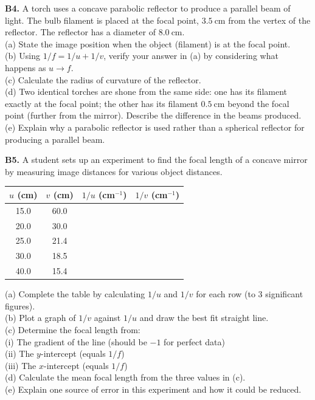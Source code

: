 \begin{exercisebox}[19]
\vspace{0.4cm}

\textbf{B4.} A torch uses a concave parabolic
reflector to produce a parallel beam of light.
The bulb filament is placed at the focal point,
$3.5\ \text{cm}$ from the vertex of the reflector.
The reflector has a diameter of $8.0\ \text{cm}$.\\[4pt]
(a) State the image position when the object
(filament) is at the focal point.\\
(b) Using $1/f = 1/u + 1/v$, verify your answer
in (a) by considering what happens as $u \to f$.\\
(c) Calculate the radius of curvature of the
reflector.\\
(d) Two identical torches are shone from the same
side: one has its filament exactly at the focal
point; the other has its filament $0.5\ \text{cm}$
beyond the focal point (further from the mirror).
Describe the difference in the beams produced.\\
(e) Explain why a parabolic reflector is used
rather than a spherical reflector for producing
a parallel beam.
\hfill{}

\vspace{0.4cm}

\textbf{B5.} A student sets up an experiment to
find the focal length of a concave mirror by
measuring image distances for various object
distances.

\begin{center}
\begin{tabular}{cccc}
\toprule
$u$ (cm) & $v$ (cm) & $1/u$ (cm$^{-1}$) &
$1/v$ (cm$^{-1}$)\\
\midrule
15.0 & 60.0 & & \\
20.0 & 30.0 & & \\
25.0 & 21.4 & & \\
30.0 & 18.5 & & \\
40.0 & 15.4 & & \\
\bottomrule
\end{tabular}
\end{center}

(a) Complete the table by calculating $1/u$ and
$1/v$ for each row (to 3 significant figures).\\
(b) Plot a graph of $1/v$ against $1/u$ and draw
the best fit straight line.\\
(c) Determine the focal length from:\\
\quad (i) The gradient of the line (should be $-1$
for perfect data)\\
\quad (ii) The $y$-intercept (equals $1/f$)\\
\quad (iii) The $x$-intercept (equals $1/f$)\\
(d) Calculate the mean focal length from the three
values in (c).\\
(e) Explain one source of error in this experiment
and how it could be reduced.
\hfill{}

\end{exercisebox}
